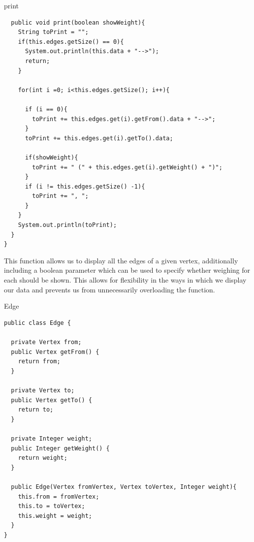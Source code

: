 \documentclass[a4paper]{article}
\begin{document}
\begin{algorithm}
\caption{print}\label{euclid}
\begin{verbatim}
  public void print(boolean showWeight){
    String toPrint = "";
    if(this.edges.getSize() == 0){
      System.out.println(this.data + "-->");
      return;
    }

    for(int i =0; i<this.edges.getSize(); i++){

      if (i == 0){
        toPrint += this.edges.get(i).getFrom().data + "-->";
      }
      toPrint += this.edges.get(i).getTo().data;

      if(showWeight){
        toPrint += " (" + this.edges.get(i).getWeight() + ")";
      }
      if (i != this.edges.getSize() -1){
        toPrint += ", ";
      }
    }
    System.out.println(toPrint);
  }
}
\end{verbatim}
\end{algorithm}

\vspace{4mm}

This function allows us to display all the edges of a given vertex,
additionally including a boolean parameter which can be used to specify 
whether weighing for each should be shown. This allows for flexibility in the 
ways in which we display our data and prevents us from unnecessarily
overloading the function.
\newpage





\vspace{6mm}
\makeatletter
\renewcommand{\ALG@name}{Class}
\makeatother
\setcounter{algorithm}{2}



\begin{algorithm}
\caption{Edge}\label{euclid}

\begin{verbatim}
public class Edge {

  private Vertex from;
  public Vertex getFrom() {
    return from;
  }

  private Vertex to;
  public Vertex getTo() {
    return to;
  }

  private Integer weight;
  public Integer getWeight() {
    return weight;
  }

  public Edge(Vertex fromVertex, Vertex toVertex, Integer weight){
    this.from = fromVertex;
    this.to = toVertex;
    this.weight = weight;
  }
}
\end{verbatim}
\end{algorithm}
\end{document}
